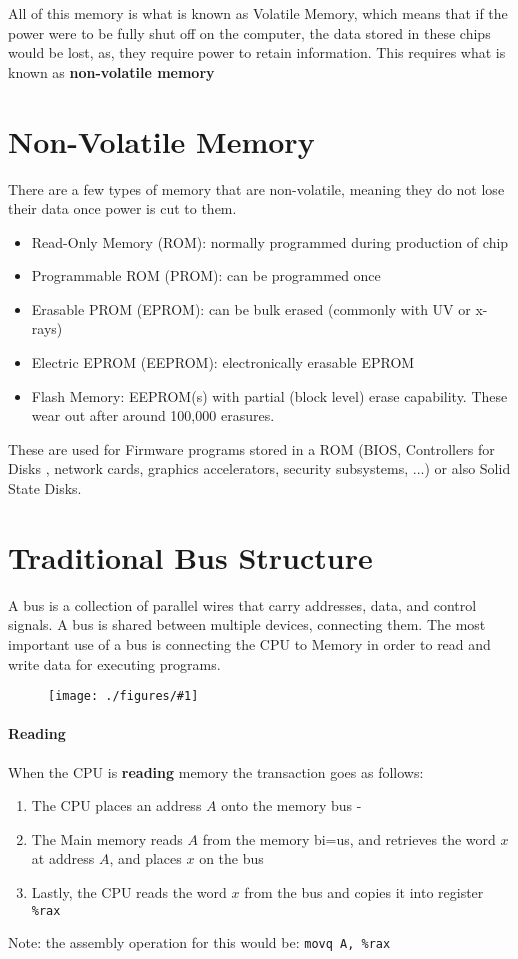 \documentclass[12pt]{book}
\newcommand{\incimg}[2]{%
       \begin{figure}[h]
               \centering
               \texttt{[image: ./figures/\#1]}
       \end{figure}
}
\begin{document}
All of this memory is what is known as Volatile Memory, which means that
if the power were to be fully shut off on the computer, the data stored in these
chips would be lost, as, they require power to retain information.
This requires what is known as \textbf{non-volatile memory} 

\section*{Non-Volatile Memory}
There are a few types of memory that are non-volatile, meaning they do not lose
their data once power is cut to them.
\begin{itemize}
        \item Read-Only Memory (ROM): normally programmed during production of
                chip
        \item Programmable ROM (PROM): can be programmed once
        \item Erasable PROM (EPROM): can be bulk erased (commonly with UV or 
                x-rays)
        \item Electric EPROM (EEPROM): electronically erasable EPROM
        \item Flash Memory: EEPROM(s) with partial (block level)
                erase capability. These wear out after around 100,000 erasures.
\end{itemize}

These are used for Firmware programs stored in a ROM (BIOS, Controllers for Disks
, network cards, graphics accelerators, security subsystems, ...) or also Solid
State Disks.

\section*{Traditional Bus Structure}
A bus is a collection of parallel wires that carry addresses, data, and control
signals. A bus is shared between multiple devices, connecting them. The most 
important use of a bus is connecting the CPU to Memory in order to read and
write data for executing programs.
\incimg{bus}{0.5}

\paragraph{Reading}
When the CPU is \textbf{reading} memory the transaction goes as follows:
\begin{enumerate}
        \item The CPU places an address $A$ onto the memory bus - 
        \item The Main memory reads $A$ from the memory bi=us, and retrieves the 
                word $x$ at address $A$, and places $x$ on the bus 
        \item Lastly, the CPU reads the word $x$ from the bus and copies it into
                register \texttt{\%rax}
\end{enumerate}
Note: the assembly operation for this would be: \texttt{movq A, \%rax}
\end{document}
